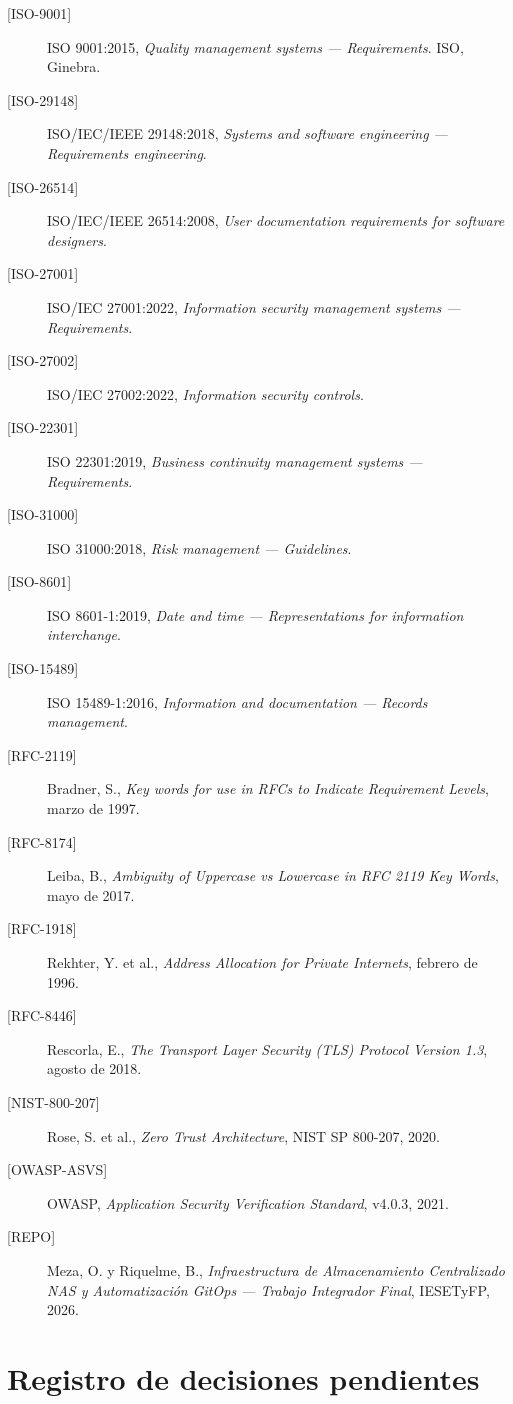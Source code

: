 \documentclass[10pt,a4paper]{article}
\begin{document}
\begin{description}
    \item[{[ISO-9001]}] ISO 9001:2015, \textit{Quality management systems — Requirements}. ISO, Ginebra.
    \item[{[ISO-29148]}] ISO/IEC/IEEE 29148:2018, \textit{Systems and software engineering — Requirements engineering}.
    \item[{[ISO-26514]}] ISO/IEC/IEEE 26514:2008, \textit{User documentation requirements for software designers}.
    \item[{[ISO-27001]}] ISO/IEC 27001:2022, \textit{Information security management systems — Requirements}.
    \item[{[ISO-27002]}] ISO/IEC 27002:2022, \textit{Information security controls}.
    \item[{[ISO-22301]}] ISO 22301:2019, \textit{Business continuity management systems — Requirements}.
    \item[{[ISO-31000]}] ISO 31000:2018, \textit{Risk management — Guidelines}.
    \item[{[ISO-8601]}] ISO 8601-1:2019, \textit{Date and time — Representations for information interchange}.
    \item[{[ISO-15489]}] ISO 15489-1:2016, \textit{Information and documentation — Records management}.
    \item[{[RFC-2119]}] Bradner, S., \textit{Key words for use in RFCs to Indicate Requirement Levels}, marzo de 1997.
    \item[{[RFC-8174]}] Leiba, B., \textit{Ambiguity of Uppercase vs Lowercase in RFC 2119 Key Words}, mayo de 2017.
    \item[{[RFC-1918]}] Rekhter, Y. et al., \textit{Address Allocation for Private Internets}, febrero de 1996.
    \item[{[RFC-8446]}] Rescorla, E., \textit{The Transport Layer Security (TLS) Protocol Version 1.3}, agosto de 2018.
    \item[{[NIST-800-207]}] Rose, S. et al., \textit{Zero Trust Architecture}, NIST SP 800-207, 2020.
    \item[{[OWASP-ASVS]}] OWASP, \textit{Application Security Verification Standard}, v4.0.3, 2021.
    \item[{[REPO]}] Meza, O. y Riquelme, B., \textit{Infraestructura de Almacenamiento Centralizado NAS y Automatización GitOps — Trabajo Integrador Final}, IESETyFP, 2026.
\end{description}

\section{Registro de decisiones pendientes}
\end{document}
